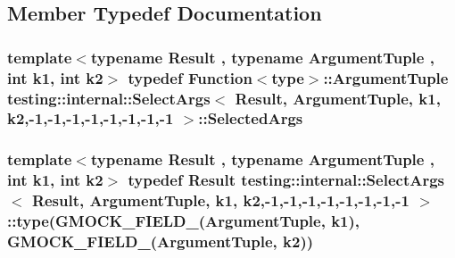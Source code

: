 \subsection{Member Typedef Documentation}
\subsubsection[{\texorpdfstring{Selected\+Args}{SelectedArgs}}]{\setlength{\rightskip}{0pt plus 5cm}template$<$typename Result , typename Argument\+Tuple , int k1, int k2$>$ typedef {\bf Function}$<${\bf type}$>$\+::Argument\+Tuple {\bf testing\+::internal\+::\+Select\+Args}$<$ Result, Argument\+Tuple, k1, k2,-\/1,-\/1,-\/1,-\/1,-\/1,-\/1,-\/1,-\/1 $>$\+::{\bf Selected\+Args}}\hypertarget{classtesting_1_1internal_1_1_select_args_3_01_result_00_01_argument_tuple_00_01k1_00_01k2_00-1_014202daea627b6852873e503b1bfe3a0_ab3c711ab2b55d52ff660d1830f987268}{}\label{classtesting_1_1internal_1_1_select_args_3_01_result_00_01_argument_tuple_00_01k1_00_01k2_00-1_014202daea627b6852873e503b1bfe3a0_ab3c711ab2b55d52ff660d1830f987268}
\subsubsection[{\texorpdfstring{type}{type}}]{\setlength{\rightskip}{0pt plus 5cm}template$<$typename Result , typename Argument\+Tuple , int k1, int k2$>$ typedef Result {\bf testing\+::internal\+::\+Select\+Args}$<$ Result, Argument\+Tuple, k1, k2,-\/1,-\/1,-\/1,-\/1,-\/1,-\/1,-\/1,-\/1 $>$\+::type({\bf G\+M\+O\+C\+K\+\_\+\+F\+I\+E\+L\+D\+\_\+}(Argument\+Tuple, k1), {\bf G\+M\+O\+C\+K\+\_\+\+F\+I\+E\+L\+D\+\_\+}(Argument\+Tuple, k2))}\hypertarget{classtesting_1_1internal_1_1_select_args_3_01_result_00_01_argument_tuple_00_01k1_00_01k2_00-1_014202daea627b6852873e503b1bfe3a0_a6a6ef276f21d62d535a5c64dba751801}{}\label{classtesting_1_1internal_1_1_select_args_3_01_result_00_01_argument_tuple_00_01k1_00_01k2_00-1_014202daea627b6852873e503b1bfe3a0_a6a6ef276f21d62d535a5c64dba751801}


